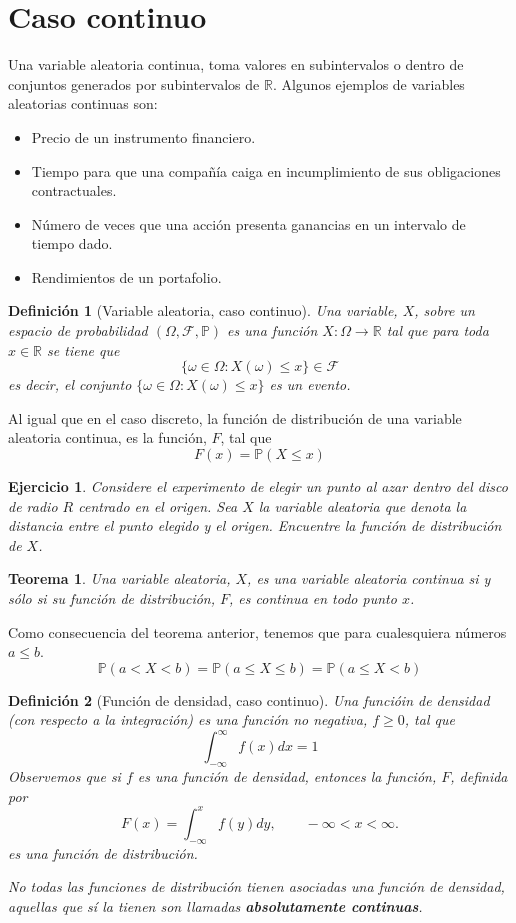 \documentclass[11pt]{report}
\theoremstyle{break}
\newtheorem{definicion}{Definición}[chapter]
\newtheorem{teorema}{Teorema}[chapter]
\newtheorem{ejercicio}{Ejercicio}[chapter]
\theoremstyle{break}
\begin{document}
\section{Caso continuo}
\label{seccion:variables continuas}
Una variable aleatoria continua, toma valores en subintervalos o dentro de conjuntos generados por subintervalos de $\mathbb{R}$. Algunos ejemplos de variables aleatorias continuas son:
\begin{itemize}
\item Precio de un instrumento financiero.
\item Tiempo para que una compañía caiga en incumplimiento de sus obligaciones contractuales.
\item Número de veces que una acción presenta ganancias en un intervalo de tiempo dado.
\item Rendimientos de un portafolio.
\end{itemize}

\begin{definicion}[Variable aleatoria, caso continuo]
\label{definicion: Variable aleatoria caso continuo}
Una variable, $X$, sobre un espacio de probabilidad $(\Omega, \mathcal{F}, \mathbb{P})$ es una función $X:\Omega \rightarrow \mathbb{R}$ tal que para toda $x \in \mathbb{R}$ se tiene que
$$
\{ \omega \in \Omega: X(\omega) \leq x \} \in \mathcal{F}
$$
es decir, el conjunto $\{ \omega \in \Omega: X(\omega) \leq x \}$ es un evento.
\end{definicion}
Al igual que en el caso discreto, la función de distribución de una variable aleatoria continua, es la función, $F$, tal que 
$$
F(x) = \mathbb{P}(X \leq x)
$$
\begin{ejercicio}
Considere el experimento de elegir un punto al azar dentro del disco de radio $R$ centrado en el origen. Sea $X$ la variable aleatoria que denota la distancia entre el punto elegido y el origen. Encuentre la función de distribución de $X$.
\end{ejercicio}

\begin{teorema}
Una variable aleatoria, $X$, es una variable aleatoria continua si y sólo si su función de distribución, $F$, es continua en todo punto $x$.
\end{teorema}
Como consecuencia del teorema anterior, tenemos que para cualesquiera números $a \leq b$.
$$
\mathbb{P}(a < X < b) = \mathbb{P}(a \leq X \leq b) = \mathbb{P}(a \leq X < b)
$$

\begin{definicion}[Función de densidad, caso continuo]
\label{definicion:funcion de densidad caso continuo}
Una funcióin de densidad (con respecto a la integración) es una función no negativa, $f\geq 0$, tal que 
$$
\int_{-\infty}^{\infty} f(x)dx = 1
$$
Observemos que si $f$ es una función de densidad, entonces la función, $F$, definida por
$$
F(x) = \int_{- \infty}^{x} f(y)dy, \qquad -\infty < x < \infty.
$$
es una función de distribución.

No todas las funciones de distribución tienen asociadas una función de densidad, aquellas que sí la tienen son llamadas \textbf{absolutamente continuas}.
\end{definicion}
\end{document}
